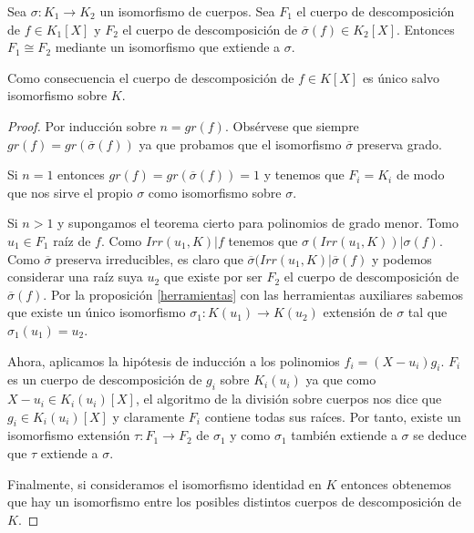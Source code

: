 \begin{theorem}
	Sea $\sigma:K_1 \to K_2$ un isomorfismo de cuerpos. Sea $F_1$ el cuerpo de descomposición de $f \in K_1[X]$ y $F_2$ el cuerpo de descomposición de $\overline{\sigma}(f) \in K_2[X]$. Entonces $F_1 \cong F_2$ mediante un isomorfismo que extiende a $\sigma$. 
	

	Como consecuencia el cuerpo de descomposición de $f \in K[X]$ es único salvo isomorfismo sobre $K$. 
\end{theorem}
\begin{proof}
	Por inducción sobre $n = gr(f)$. Obsérvese que siempre $gr(f) = gr(\overline{\sigma}(f))$ ya que probamos que el isomorfismo $\overline{\sigma}$ preserva grado. 
	
	Si $n = 1$ entonces $gr(f) = gr(\overline{\sigma}(f)) = 1$ y tenemos que $F_i = K_i$ de modo que nos sirve el propio $\sigma$ como isomorfismo sobre $\sigma$. 
	
	Si $n > 1$ y supongamos el teorema cierto para polinomios de grado menor. Tomo $u_1 \in F_1$ raíz de $f$. Como $Irr(u_1,K)|f$ tenemos que $\sigma(Irr(u_1,K))|\sigma(f)$. Como $\overline{\sigma}$ preserva irreducibles, es claro que $\overline{\sigma}(Irr(u_1,K)|\overline{\sigma}(f)$ y podemos considerar una raíz suya $u_2$ que existe por ser $F_2$ el cuerpo de descomposición de $\overline{\sigma}(f)$. Por la proposición \ref{herramientas} con las herramientas auxiliares sabemos que existe un único isomorfismo $\sigma_1:K(u_1) \to K(u_2)$ extensión de $\sigma$ tal que $\sigma_1(u_1) = u_2$. 
	
	Ahora, aplicamos la hipótesis de inducción a los polinomios $f_i = (X-u_i)g_i$. $F_i$ es un cuerpo de descomposición de $g_i$ sobre $K_i(u_i)$ ya que como $X-u_i \in K_i(u_i)[X]$, el algoritmo de la división sobre cuerpos nos dice que $g_i \in K_i(u_i)[X]$ y claramente $F_i$ contiene todas sus raíces. Por tanto, existe un isomorfismo extensión $\tau:F_1 \to F_2$ de $\sigma_1$ y como $\sigma_1$ también extiende a $\sigma$ se deduce que $\tau$ extiende a $\sigma$. 
	
	Finalmente, si consideramos el isomorfismo identidad en $K$ entonces obtenemos que hay un isomorfismo entre los posibles distintos cuerpos de descomposición de $K$.
\end{proof}

